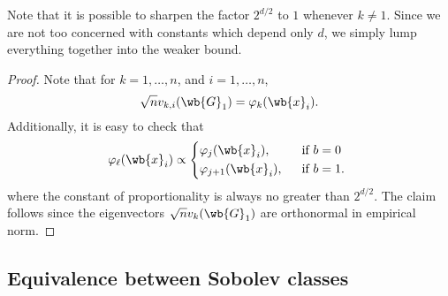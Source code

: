 \documentclass{article}
\newcommand{\1}{\mathbf{1}}
\theoremstyle{alden}
\theoremstyle{aldenthm}
\theoremstyle{definition}
\theoremstyle{remark}
\begin{document}
Note that it is possible to sharpen the factor $2^{d/2}$ to $1$ whenever $k \neq 1$. Since we are not too concerned with constants which depend only $d$, we simply lump everything together into the weaker bound.

\begin{proof}
	Note that for $k = 1,\ldots,n$, and $i = 1,\ldots,n$,
	\begin{equation*}
	\sqrt{n}v_{k,i}(\wb{G}_1) = \varphi_k(\wb{x}_i).
	\end{equation*}
	Additionally, it is easy to check that
	\begin{equation*}
	\varphi_{\ell}(\wb{x}_i) \propto
	\begin{cases*}
	\varphi_{j}(\wb{x}_i),& ~~\textrm{if $b = 0$} \\
	\varphi_{j + 1}(\wb{x}_i),& ~~\textrm{if $b = 1$.}
	\end{cases*}
	\end{equation*}
	where the constant of proportionality is always no greater than $2^{d/2}$.
	The claim follows since the eigenvectors $\sqrt{n} v_k(\wb{G}_1)$ are orthonormal in empirical norm.	
\end{proof}

\subsection{Equivalence between Sobolev classes}
\label{subsec:sobolev_class_equivalence}
\end{document}
